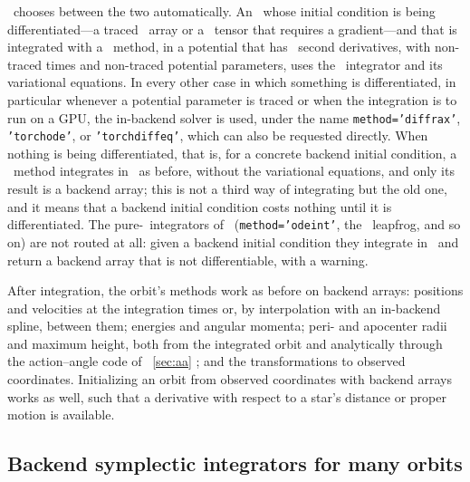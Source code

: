 \galpy\ chooses between the two automatically. An \orb\ whose
initial condition is being differentiated---a traced \jax\ array or a
\torch\ tensor that requires a gradient---and that is integrated with
a \cc\ method, in a potential that has \cc\ second derivatives, with
non-traced times and non-traced potential parameters, uses the \cc\
integrator and its variational equations. In every other case in
which something is differentiated, in particular whenever a potential
parameter is traced or when the integration is to run on a GPU, the
in-backend solver is used, under the name \texttt{method='diffrax'},
\texttt{'torchode'}, or \texttt{'torchdiffeq'}, which can also be
requested directly. When nothing is being differentiated, that is, for
a concrete backend initial condition, a \cc\ method integrates in
\cc\ as before, without the variational equations, and only its result
is a backend array; this is not a third way of integrating but the old
one, and it means that a backend initial condition costs nothing until
it is differentiated. The pure-\python\ integrators of \galpy\
(\texttt{method='odeint'}, the \python\ leapfrog, and so on) are not
routed at all: given a backend initial condition they integrate in
\numpy\ and return a backend array that is not differentiable, with a
warning.

After integration, the orbit's methods work as before on backend
arrays: positions and velocities at the integration times or, by
interpolation with an in-backend spline, between them; energies and
angular momenta; peri- and apocenter radii and maximum height, both
from the integrated orbit and analytically through the action--angle
code of \sectionname~\ref{sec:aa} \citep{MackerethBovy2018}; and the transformations to observed
coordinates. Initializing an orbit from observed coordinates with
backend arrays works as well, such that a derivative with respect to a
star's distance or proper motion is available.

\subsection{Backend symplectic integrators for many orbits}\label{sec:orbit-leapfrog}


